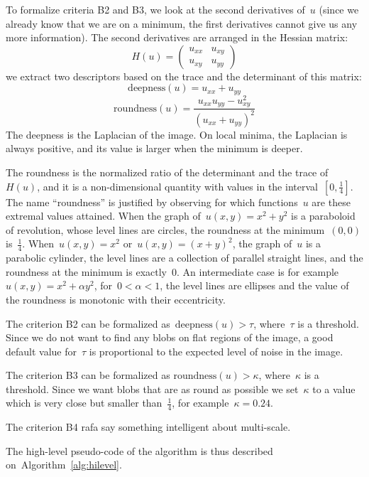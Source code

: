 \documentclass[a4paper]{article}
\begin{document}
To formalize criteria B2 and B3, we look at the second derivatives of~$u$
(since we already know that we are on a minimum, the first derivatives cannot
give us any more information).  The second derivatives are arranged in the
Hessian matrix:
\[
	H(u)=\begin{pmatrix}u_{xx} & u_{xy} \\ u_{xy} & u_{yy}\end{pmatrix}
\]
we extract two descriptors based on the trace and the determinant of this
matrix:
\[
	\mathrm{deepness}(u)=u_{xx}+u_{yy}
\]
\[
	\mathrm{roundness}(u)=\frac{u_{xx}u_{yy} - u_{xy}^2}{\left(u_{xx}+u_{yy} \right)^2}
\]
The deepness is the Laplacian of the image.  On local minima, the Laplacian is
always positive, and its value is larger when the minimum is deeper.

The roundness is the normalized ratio of the determinant and the trace
of~$H(u)$, and it is a non-dimensional quantity with values in the
interval~$[0,\frac{1}{4}]$.
The name ``roundness'' is justified by observing for which functions~$u$ are
these extremal values attained.  When the graph of~$u(x,y)=x^2+y^2$ is a
paraboloid of revolution, whose level lines are circles, the roundness at the
minimum~$(0,0)$ is~$\frac{1}{4}$.  When~$u(x,y)=x^2$ or~$u(x,y)=(x+y)^2$, the
graph of~$u$ is a parabolic cylinder, the level lines are a collection of
parallel straight lines, and the roundness at the minimum is exactly~$0$.  An
intermediate case is for example~$u(x,y)=x^2+\alpha y^2$, for~$0 < \alpha < 1$,
the level lines are ellipses and the value of the roundness is monotonic with
their eccentricity.

The criterion B2 can be formalized as~$\mathrm{deepness}(u) > \tau$,
where~$\tau$ is a threshold.  Since we do not want to find any blobs on flat
regions of the image, a good default value for~$\tau$ is proportional to the
expected level of noise in the image.

The criterion B3 can be formalized as $\mathrm{roundness}(u) > \kappa$,
where~$\kappa$ is a threshold.  Since we want blobs that are as round as
possible we set~$\kappa$ to a value which is very close but smaller
than~$\frac{1}{4}$, for example~$\kappa=0.24$.

The criterion B4 {\color{red} rafa say something intelligent about multi-scale}.

The high-level pseudo-code of the algorithm is thus described
on~Algorithm~\ref{alg:hilevel}.
\end{document}
